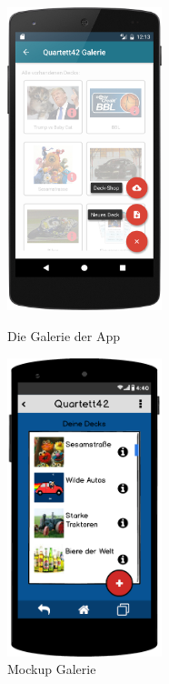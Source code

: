 \begin{figure}[h]
    \centering
    \begin{minipage}{0.49\textwidth}
        \centering
        \includegraphics[width=0.4\textwidth]{img/screenshots/device_gallery.png}
		\caption{Die Galerie der App}
		\label{figure:implementierunggalerie} 
	\end{minipage}
    \begin{minipage}{0.49\textwidth}
        \centering
        \includegraphics[width=0.4\textwidth]{img/mockups/galerie_uebersicht.png}
        \caption{Mockup Galerie}
    \end{minipage}
\end{figure}

